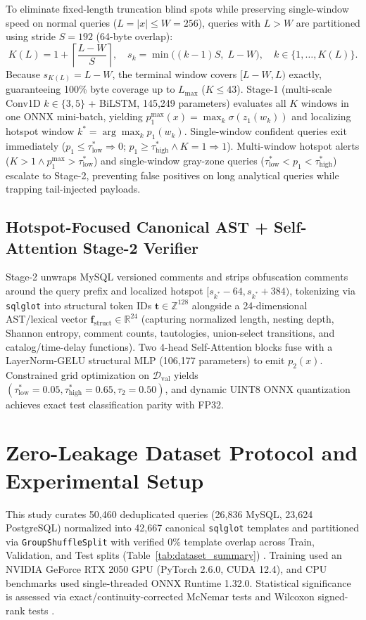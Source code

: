 \documentclass[preprint,12pt]{elsarticle}
\begin{document}
To eliminate fixed-length truncation blind spots while preserving single-window speed on normal queries ($L = |x| \le W = 256$), queries with $L > W$ are partitioned using stride $S = 192$ (64-byte overlap):
\begin{equation}
K(L) = 1 + \left\lceil \frac{L - W}{S} \right\rceil, \quad s_k = \min\big((k-1)S, \; L - W\big), \quad k \in \{1, \dots, K(L)\}.
\end{equation}
Because $s_{K(L)} = L - W$, the terminal window covers $[L-W, L)$ exactly, guaranteeing 100\% byte coverage up to $L_{\max}$ ($K \le 43$). Stage-1 (multi-scale Conv1D $k \in \{3,5\}$ + BiLSTM, 145,249 parameters) evaluates all $K$ windows in one ONNX mini-batch, yielding $p_1^{\max}(x) = \max_k \sigma(z_1(w_k))$ and localizing hotspot window $k^* = \arg\max_k p_1(w_k)$. Single-window confident queries exit immediately ($p_1 \le \tau_{\text{low}}^* \Rightarrow 0$; $p_1 \ge \tau_{\text{high}}^* \wedge K=1 \Rightarrow 1$). Multi-window hotspot alerts ($K > 1 \wedge p_1^{\max} > \tau_{\text{low}}^*$) and single-window gray-zone queries ($\tau_{\text{low}}^* < p_1 < \tau_{\text{high}}^*$) escalate to Stage-2, preventing false positives on long analytical queries while trapping tail-injected payloads.

\subsection{Hotspot-Focused Canonical AST + Self-Attention Stage-2 Verifier}
Stage-2 unwraps MySQL versioned comments and strips obfuscation comments around the query prefix and localized hotspot $[s_{k^*}-64, s_{k^*}+384)$, tokenizing via \texttt{sqlglot} into structural token IDs $\mathbf{t} \in \mathbb{Z}^{128}$ alongside a 24-dimensional AST/lexical vector $\mathbf{f}_{\text{struct}} \in \mathbb{R}^{24}$ (capturing normalized length, nesting depth, Shannon entropy, comment counts, tautologies, union-select transitions, and catalog/time-delay functions). Two 4-head Self-Attention blocks fuse with a LayerNorm-GELU structural MLP (106,177 parameters) to emit $p_2(x)$. Constrained grid optimization on $\mathcal{D}_{\text{val}}$ yields $(\tau_{\text{low}}^*=0.05, \tau_{\text{high}}^*=0.65, \tau_2=0.50)$, and dynamic UINT8 ONNX quantization achieves exact test classification parity with FP32.

\section{Zero-Leakage Dataset Protocol and Experimental Setup}
This study curates 50,460 deduplicated queries (26,836 MySQL, 23,624 PostgreSQL) normalized into 42,667 canonical \texttt{sqlglot} templates and partitioned via \texttt{GroupShuffleSplit} with verified 0\% template overlap across Train, Validation, and Test splits (Table~\ref{tab:dataset_summary}) \cite{pendlebury2019tesseract,arp2022dos_donts}. Training used an NVIDIA GeForce RTX 2050 GPU (PyTorch 2.6.0, CUDA 12.4), and CPU benchmarks used single-threaded ONNX Runtime 1.32.0. Statistical significance is assessed via exact/continuity-corrected McNemar tests \cite{mcnemar1947} and Wilcoxon signed-rank tests \cite{wilcoxon1945,demsar2006statistical}.
\end{document}
